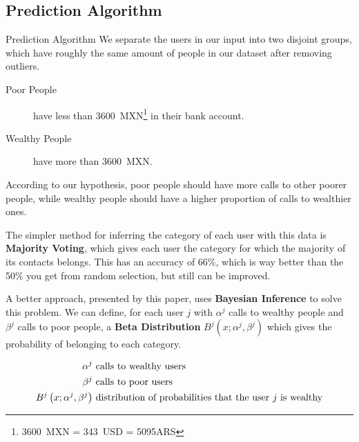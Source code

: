 \documentclass{beamer}
\newcommand{\Beta}{B}
\begin{document}
\subsection{Prediction Algorithm}
\begin{frame}{Prediction Algorithm}
	We separate the users in our input into two disjoint groups, which have roughly the same amount of people in our dataset after removing outliers.

	\begin{description}
		\item[Poor People] have less than \num{3600}~MXN\footnote{3600~MXN = 343~USD = \num{5095}ARS} in their bank account.
		\item[Wealthy People] have more than \num{3600}~MXN.\@
	\end{description}

	According to our hypothesis, poor people should have more calls to other poorer people, while wealthy people should have a higher proportion of calls to wealthier ones.
\end{frame}

\begin{frame}
	The simpler method for inferring the category of each user with this data is \textbf{Majority Voting}, which gives each user the category for which the majority of its contacts belongs. This has an accuracy of 66\%, which is way better than the 50\% you get from random selection, but still can be improved.
\end{frame}

\begin{frame}
	A better approach, presented by this paper, uses \textbf{Bayesian Inference} to solve this problem. We can define, for each user \( j \) with \( \alpha^j \) calls to wealthy people and \( \beta^j \) calls to poor people, a \textbf{Beta Distribution} \( \Beta^j ( x; \alpha^j, \beta^j ) \) which gives the probability of belonging to each category.

	\pause{}

	\[
	\begin{split}
		\alpha^j &\text{ calls to wealthy users} \\
		\beta^j  &\text{ calls to poor users} \\
		\Beta^j \left( x; \alpha^j, \beta^j \right) &\text{ distribution of probabilities that the user \( j \) is wealthy}
	\end{split}
	\]

\end{frame}
\end{document}
